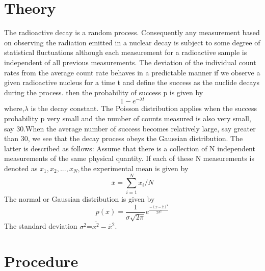 	\section{Theory}
		The radioactive decay is a random process. Consequently any measurement based on observing the radiation emitted in a nuclear decay is subject to some degree of statistical fluctuations although each measurement for a   radioactive sample is independent of all previous measurements. The deviation of the individual count rates from the average count rate behaves in a predictable manner if we observe a given radioactive nucleus for a time t and define the success as the nuclide decays during the process. then the probability of success p is given by 
		\begin{equation} 
			1-e^{-\lambda t}
		\end{equation}
		where,$\lambda$ is the decay constant. The Poisson	distribution applies when the success probability p very small and the number of counts measured is also very small, say 30.When the average number of success becomes relatively large, say greater than 30, we see that the decay process obeys the Gaussian distribution.
	The latter is described as follows:
	Assume that there is a collection of N independent measurements of the same physical quantity. If each of these N measurements is denoted
	as $x_{1}, x_{2}, . . . , x_{N} ,$the experimental mean is given by
	\begin{equation}
	\bar{x}=\sum\limits_{i=1}^{N}x_i/N
	\end{equation}
	The normal or Gaussian distribution is given by
	\begin{equation}
	p(x)=\frac{1}{\sigma\sqrt{2 \pi }} e^{\frac{-(x-\bar{x})^2}{2 \sigma^2}}
	\end{equation}
	The standard deviation $\sigma^2$=$\bar{x^2}-\bar{x}^2$. 
	\section{Procedure}
	
